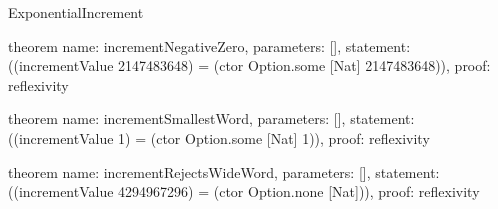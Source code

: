 \begin{lexlean}{ExponentialIncrement}
\begin{semanticmodule}
theorem{
  name: incrementNegativeZero,
  parameters: [],
  statement: ((incrementValue 2147483648) = (ctor Option.some [Nat] 2147483648)),
  proof: reflexivity{}
}

theorem{
  name: incrementSmallestWord,
  parameters: [],
  statement: ((incrementValue 1) = (ctor Option.some [Nat] 1)),
  proof: reflexivity{}
}

theorem{
  name: incrementRejectsWideWord,
  parameters: [],
  statement: ((incrementValue 4294967296) = (ctor Option.none [Nat])),
  proof: reflexivity{}
}

\end{semanticmodule}
\end{lexlean}

